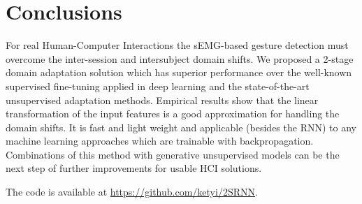 \documentclass[conference]{IEEEtran}
\begin{document}
\section{Conclusions}

For real Human-Computer Interactions the sEMG-based gesture detection must overcome the inter-session and intersubject domain shifts. We proposed a 2-stage domain adaptation solution which has superior performance over the well-known supervised fine-tuning applied in deep learning and the state-of-the-art unsupervised adaptation methods. Empirical results show that the linear transformation of the input features is a good approximation for handling the domain shifts. It is fast and light weight and applicable (besides the RNN) to any machine learning approaches which are trainable with backpropagation. Combinations of this method with generative unsupervised models can be the next step of further improvements for usable HCI solutions.

The code is available at \url{https://github.com/ketyi/2SRNN}.
\end{document}
